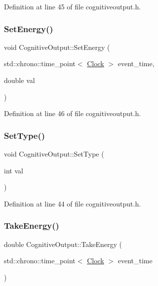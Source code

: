 Definition at line 45 of file cognitiveoutput.\+h.

\mbox{\label{class_cognitive_output_acc16ca3521689776ecd68255ece1e671}} 
\subsubsection{\texorpdfstring{Set\+Energy()}{SetEnergy()}}
{\footnotesize\ttfamily void Cognitive\+Output\+::\+Set\+Energy (\begin{DoxyParamCaption}\item[{std\+::chrono\+::time\+\_\+point$<$ \hyperlink{universe_8h_a0ef8d951d1ca5ab3cfaf7ab4c7a6fd80}{Clock} $>$}]{event\+\_\+time,  }\item[{double}]{val }\end{DoxyParamCaption})\hspace{0.3cm}{\ttfamily [inline]}}



Definition at line 46 of file cognitiveoutput.\+h.

\mbox{\label{class_cognitive_output_ac76f41ab3b65ea466e9e2999270f2e5a}} 
\subsubsection{\texorpdfstring{Set\+Type()}{SetType()}}
{\footnotesize\ttfamily void Cognitive\+Output\+::\+Set\+Type (\begin{DoxyParamCaption}\item[{int}]{val }\end{DoxyParamCaption})\hspace{0.3cm}{\ttfamily [inline]}}



Definition at line 44 of file cognitiveoutput.\+h.

\mbox{\label{class_cognitive_output_aae27d114676c68e02ae6e7ae36326ba8}} 
\subsubsection{\texorpdfstring{Take\+Energy()}{TakeEnergy()}}
{\footnotesize\ttfamily double Cognitive\+Output\+::\+Take\+Energy (\begin{DoxyParamCaption}\item[{std\+::chrono\+::time\+\_\+point$<$ \hyperlink{universe_8h_a0ef8d951d1ca5ab3cfaf7ab4c7a6fd80}{Clock} $>$}]{event\+\_\+time }\end{DoxyParamCaption})\hspace{0.3cm}{\ttfamily [inline]}}



